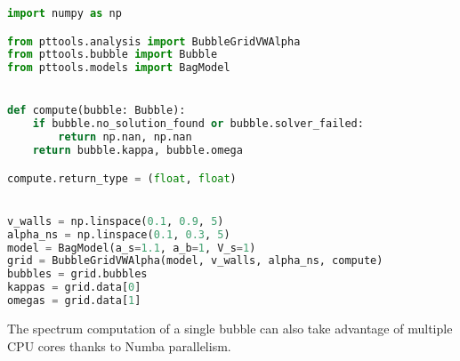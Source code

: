\begin{lstlisting}[language=Python]
import numpy as np

from pttools.analysis import BubbleGridVWAlpha
from pttools.bubble import Bubble
from pttools.models import BagModel


def compute(bubble: Bubble):
	if bubble.no_solution_found or bubble.solver_failed:
		return np.nan, np.nan
	return bubble.kappa, bubble.omega

compute.return_type = (float, float)


v_walls = np.linspace(0.1, 0.9, 5)
alpha_ns = np.linspace(0.1, 0.3, 5)
model = BagModel(a_s=1.1, a_b=1, V_s=1)
grid = BubbleGridVWAlpha(model, v_walls, alpha_ns, compute)
bubbles = grid.bubbles
kappas = grid.data[0]
omegas = grid.data[1]
\end{lstlisting}

The spectrum computation of a single bubble can also take advantage of multiple CPU cores thanks to Numba parallelism.
